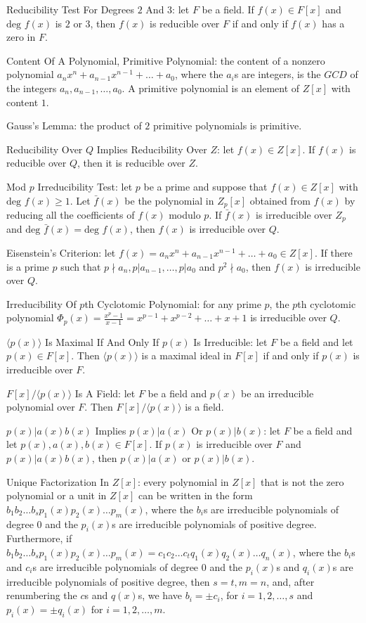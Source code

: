 Reducibility Test For Degrees $2$ And $3$: let $F$ be a field. If $f(x) \in F[x]$ and $\text{deg }f(x)$ is $2$ or $3$, then $f(x)$ is reducible over $F$ if and only if $f(x)$ has a zero in $F$.

Content Of A Polynomial, Primitive Polynomial: the content of a nonzero polynomial $a_n x^n + a_{n-1} x^{n-1} + \dots + a_0$, where the $a_i$s are integers, is the $GCD$ of the integers $a_n,a_{n-1},\dots,a_0$. A primitive polynomial is an element of $Z[x]$ with content $1$.

Gauss's Lemma: the product of $2$ primitive polynomials is primitive.

Reducibility Over $Q$ Implies Reducibility Over $Z$: let $f(x) \in Z[x]$. If $f(x)$ is reducible over $Q$, then it is reducible over $Z$.

Mod $p$ Irreducibility Test: let $p$ be a prime and suppose that $f(x) \in Z[x]$ with $\text{deg }f(x) \ge 1$. Let $\bar{f}(x)$ be the polynomial in $Z_p [x]$ obtained from $f(x)$ by reducing all the coefficients of $f(x)$ modulo $p$. If $\bar{f}(x)$ is irreducible over $Z_p$ and $\text{deg }\bar{f}(x)=\text{deg }f(x)$, then $f(x)$ is irreducible over $Q$.

Eisenstein's Criterion: let $f(x) = a_n x^n + a_{n-1} x^{n-1} + \dots + a_0 \in Z[x]$. If there is a prime $p$ such that $p \nmid a_n, p | a_{n-1},\dots,p|a_0$ and $p^2 \nmid a_0$, then $f(x)$ is irreducible over $Q$.

Irreducibility Of $p$th Cyclotomic Polynomial: for any prime $p$, the $p$th cyclotomic polynomial $\Phi_p (x) = \frac{x^p-1}{x-1} = x^{p-1}+x^{p-2}+\dots +x+1$ is irreducible over $Q$.

$\langle p(x) \rangle$ Is Maximal If And Only If $p(x)$ Is Irreducible: let $F$ be a field and let $p(x) \in F[x]$. Then $\langle p(x) \rangle$ is a maximal ideal in $F[x]$ if and only if $p(x)$ is irreducible over $F$.

$F[x]/\langle p(x) \rangle$ Is A Field: let $F$ be a field and $p(x)$ be an irreducible polynomial over $F$. Then $F[x]/\langle p(x) \rangle$ is a field.

$p(x) | a(x)b(x)$ Implies $p(x) | a(x)$ Or $p(x) | b(x)$: let $F$ be a field and let $p(x),a(x),b(x) \in F[x]$. If $p(x)$ is irreducible over $F$ and $p(x) | a(x)b(x)$, then $p(x) | a(x)$ or $p(x) | b(x)$.

Unique Factorization In $Z[x]$: every polynomial in $Z[x]$ that is not the zero polynomial or a unit in $Z[x]$ can be written in the form $b_1 b_2 \dots b_s p_1 (x)p_2 (x) \dots p_m (x)$, where the $b_i$s are irreducible polynomials of degree $0$ and the $p_i (x)$s are irreducible polynomials of positive degree. Furthermore, if $b_1 b_2 \dots b_s p_1 (x) p_2 (x) \dots p_m (x) = c_1 c_2 \dots c_t q_1 (x) q_2 (x) \dots q_n (x)$, where the $b_i$s and $c_i$s are irreducible polynomials of degree $0$ and the $p_i (x)$s and $q_i (x)$s are irreducible polynomials of positive degree, then $s=t,m=n$, and, after renumbering the $c$s and $q(x)$s, we have $b_i = \pm c_i$, for $i=1,2,\dots,s$ and $p_i (x) = \pm q_i (x)$ for $i=1,2,\dots,m$.

